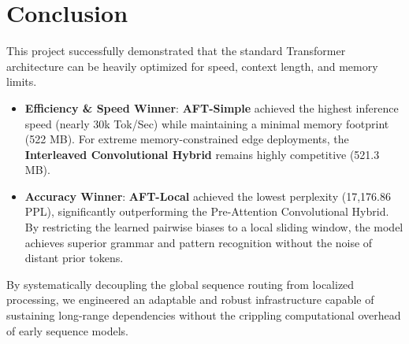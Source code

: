 \documentclass[11pt,a4paper]{article}
\begin{document}
\section{Conclusion}

This project successfully demonstrated that the standard Transformer architecture can be heavily optimized for speed, context length, and memory limits. 

\begin{itemize}
    \item \textbf{Efficiency \& Speed Winner}: \textbf{AFT-Simple} achieved the highest inference speed (nearly 30k Tok/Sec) while maintaining a minimal memory footprint (522 MB). For extreme memory-constrained edge deployments, the \textbf{Interleaved Convolutional Hybrid} remains highly competitive (521.3 MB).
    \item \textbf{Accuracy Winner}: \textbf{AFT-Local} achieved the lowest perplexity (17,176.86 PPL), significantly outperforming the Pre-Attention Convolutional Hybrid. By restricting the learned pairwise biases to a local sliding window, the model achieves superior grammar and pattern recognition without the noise of distant prior tokens.
\end{itemize}

By systematically decoupling the global sequence routing from localized processing, we engineered an adaptable and robust infrastructure capable of sustaining long-range dependencies without the crippling computational overhead of early sequence models.
\end{document}
